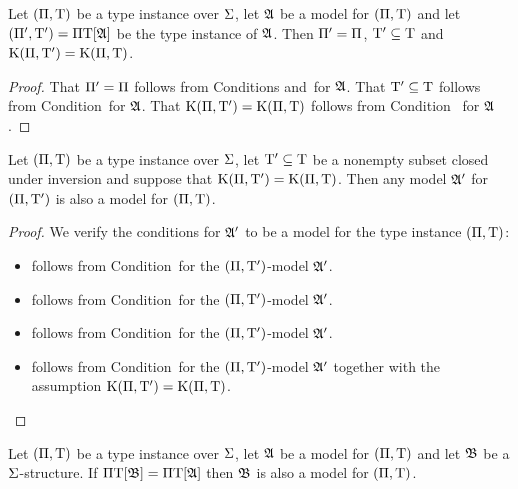 \begin{remark}\label{rem:str-tpi-kings-eq}
Let $(\Pi,\mathrm{T})$ be a type instance over $\mathrm{\Sigma}$, 
let $\mathfrak{A}$ be a model for $(\Pi,\mathrm{T})$
and let $({\Pi'},{\mathrm{T}'}) =\Pi\mathrm{T}[\mathfrak{A}]$ be the type instance of $\mathfrak{A}$.
Then ${\Pi'} = \Pi$, ${\mathrm{T}'} \subseteq \mathrm{T}$ and $\mathrm{K}(\Pi,{\mathrm{T}'}) =
\mathrm{K}(\Pi,\mathrm{T})$.
\end{remark}
\begin{proof}
That ${\Pi'} = \Pi$ follows from Conditions 
and~ for $\mathfrak{A}$.
That ${\mathrm{T}'} \subseteq \mathrm{T}$ follows from Condition~ for
$\mathfrak{A}$.
That $\mathrm{K}(\Pi,{\mathrm{T}'}) = \mathrm{K}(\Pi,\mathrm{T})$ follows from Condition~
for $\mathfrak{A}$.
\end{proof}
\begin{remark}\label{rem:tpi-str-ext}
Let $(\Pi,\mathrm{T})$ be a type instance over $\mathrm{\Sigma}$, let ${\mathrm{T}'} \subseteq
\mathrm{T}$ be a nonempty subset closed under inversion and suppose that
$\mathrm{K}(\Pi,{\mathrm{T}'}) = \mathrm{K}(\Pi,\mathrm{T})$. Then any model $\mathfrak{A'}$ for
$(\Pi,{\mathrm{T}'})$ is also a model for $(\Pi,\mathrm{T})$.
\end{remark}
\begin{proof}
We verify the conditions for $\mathfrak{A'}$ to be a model for the type instance
$(\Pi,\mathrm{T})$:
\begin{itemize}
  \item[\refcondrealizI] follows from Condition~ for the
  $(\Pi,{\mathrm{T}'})$-model $\mathfrak{A'}$.
  \item[\refcondrealizII] follows from Condition~ for the
  $(\Pi,{\mathrm{T}'})$-model $\mathfrak{A'}$.
  \item[\refcondrealizp] follows from Condition~ for the
  $(\Pi,{\mathrm{T}'})$-model $\mathfrak{A'}$.
  \item[\refcondrealizk] follows from Condition~ for the
  $(\Pi,{\mathrm{T}'})$-model $\mathfrak{A'}$ together with the assumption
  $\mathrm{K}(\Pi,{\mathrm{T}'}) = \mathrm{K}(\Pi,\mathrm{T})$.
\end{itemize}
\end{proof}
\begin{remark}
Let $(\Pi,\mathrm{T})$ be a type instance over $\mathrm{\Sigma}$,
let $\mathfrak{A}$ be a model for $(\Pi,\mathrm{T})$
and let $\mathfrak{B}$ be a $\mathrm{\Sigma}$-structure.
If $\Pi\mathrm{T}[\mathfrak{B}] = \Pi\mathrm{T}[\mathfrak{A}]$ then $\mathfrak{B}$ is also a model for
$(\Pi,\mathrm{T})$.
\end{remark}
